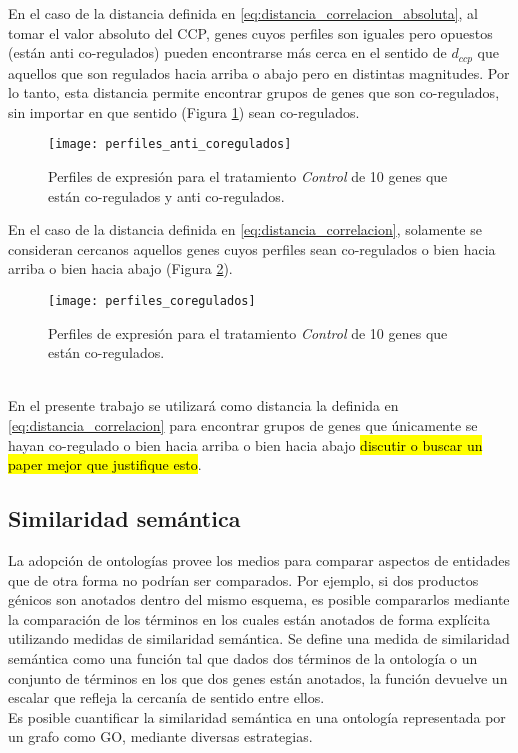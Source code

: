 En el caso de la distancia definida en \ref{eq:distancia_correlacion_absoluta}, al tomar el valor absoluto del CCP, genes cuyos perfiles son iguales pero opuestos (están anti co-regulados) pueden encontrarse más cerca en el sentido de $d_{ccp}$ que aquellos que son regulados hacia arriba o abajo pero en distintas magnitudes. Por lo tanto, esta distancia permite encontrar grupos de genes que son co-regulados, sin importar en que sentido (Figura \ref{fig:perfiles_anti_coregulados}) sean co-regulados.
\begin{figure}[h]
    \centering
    \texttt{[image: perfiles\_anti\_coregulados]}
    \caption{Perfiles de expresión para el tratamiento \textit{Control} de 10 genes que están co-regulados y anti co-regulados.}
    \label{fig:perfiles_anti_coregulados}
\end{figure}
En el caso de la distancia definida en \ref{eq:distancia_correlacion}, solamente se consideran cercanos aquellos genes cuyos perfiles sean co-regulados o bien hacia arriba o bien hacia abajo (Figura \ref{fig:perfiles_coregulados}).
\begin{figure}[h]
    \centering
    \texttt{[image: perfiles\_coregulados]}
    \caption{Perfiles de expresión para el tratamiento \textit{Control} de 10 genes que están co-regulados.}
    \label{fig:perfiles_coregulados}
\end{figure}
\cite{Hennig2013}\cite{Kheng2010}\cite{Babu2004}\cite{Gan2007}\\
En el presente trabajo se utilizará como distancia la definida en \ref{eq:distancia_correlacion} para encontrar grupos de genes que únicamente se hayan co-regulado o bien hacia arriba o bien hacia abajo \cite{Eisen1998} \hl{discutir o buscar un paper mejor que justifique esto}.
\clearpage
\subsection{Similaridad semántica}
La adopción de ontologías provee los medios para comparar aspectos de entidades que de otra forma no podrían ser comparados. Por ejemplo, si dos productos génicos son anotados dentro del mismo esquema, es posible compararlos mediante la comparación de los términos en los cuales están anotados de forma explícita utilizando medidas de similaridad semántica. Se define una medida de similaridad semántica como una función tal que dados dos términos de la ontología o un conjunto de términos en los que dos genes están anotados, la función devuelve un escalar que refleja la cercanía de sentido entre ellos.\\
Es posible cuantificar la similaridad semántica en una ontología representada por un grafo como GO, mediante diversas estrategias.
